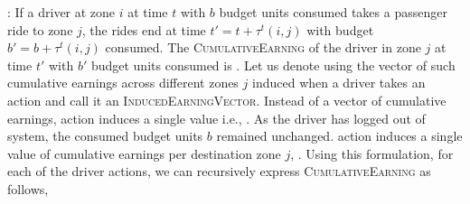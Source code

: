 :
If a driver at zone $i$ at time $t$ with $b$ budget units consumed takes a passenger ride to zone $j$, the rides end at time 
$t' = t + \tau^t(i,j)$ with budget $b' = b + \tau^t(i,j)$ consumed. The \textsc{CumulativeEarning} of the driver in zone $j$ at time $t'$ with $b'$
budget units consumed is {}. Let us denote using {} the vector of such
cumulative earnings across different zones $j$ induced when a driver takes an action {\getpassengeraction} and call it an 
\textsc{InducedEarningVector}. Instead of a vector of cumulative earnings, {\gohome} action induces a single value i.e., {}. 
As the driver has logged out of system, the consumed budget units $b$ remained unchanged. {\relocate} action induces a single value of cumulative earnings per destination zone $j$, {}. 
Using this formulation, for each of the driver actions, we can recursively express \textsc{CumulativeEarning} as follows,
